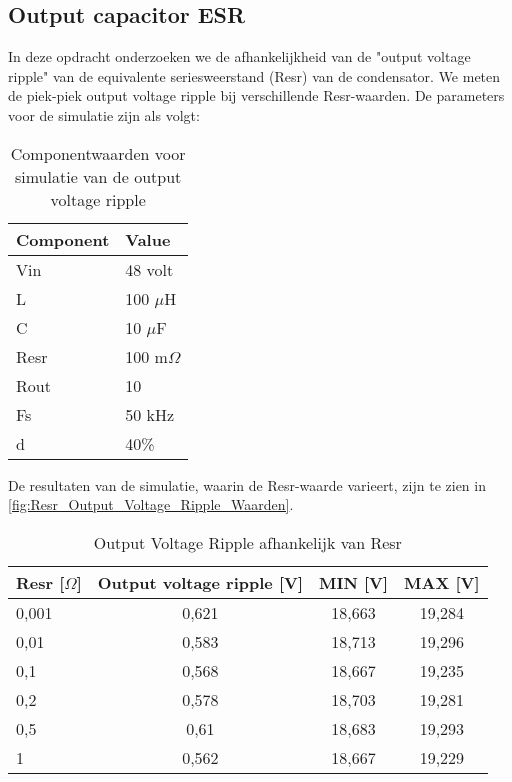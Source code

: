 \subsection{Output capacitor ESR}
In deze opdracht onderzoeken we de afhankelijkheid van de "output voltage ripple" van de equivalente seriesweerstand (Resr) van de condensator. We meten de piek-piek output voltage ripple bij verschillende Resr-waarden. De parameters voor de simulatie zijn als volgt:
\begin{table}[h!]
\centering
\begin{tabular}{|l|l|}
\hline
\textbf{Component} & \textbf{Value} \\
\hline
Vin  & 48 volt \\
L    & 100 $\mu$H \\
C    & 10 $\mu$F \\
Resr & 100 m$\Omega$ \\
Rout & 10 \\
Fs   & 50 kHz \\
d    & 40\% \\
\hline
\end{tabular}
\caption{Componentwaarden voor simulatie van de output voltage ripple}
\label{fig:Componentwaarden voor simulatie2.4}
\end{table}

De resultaten van de simulatie, waarin de Resr-waarde varieert, zijn te zien in \autoref{fig:Resr_Output_Voltage_Ripple_Waarden}.
\begin{table}[h!]
\centering
\begin{tabular}{|l|c|c|c|}
\hline
\textbf{Resr [\(\Omega\)]} & \textbf{Output voltage ripple [V]} & \textbf{MIN [V]} & \textbf{MAX [V]} \\
\hline
0,001  & 0,621  & 18,663  & 19,284 \\
0,01   & 0,583  & 18,713  & 19,296 \\
0,1    & 0,568  & 18,667  & 19,235 \\
0,2    & 0,578  & 18,703  & 19,281 \\
0,5    & 0,61   & 18,683  & 19,293 \\
1      & 0,562  & 18,667  & 19,229 \\
\hline
\end{tabular}
\caption{Output Voltage Ripple afhankelijk van Resr}
\label{fig:Resr_Output_Voltage_Ripple_Waarden}
\end{table}

